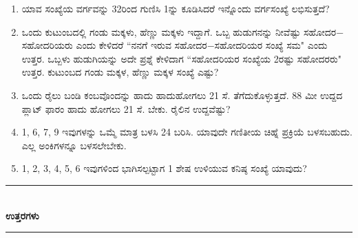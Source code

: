 \begin{enumerate}
\item ಯಾವ ಸಂಖ್ಯೆಯ ವರ್ಗವನ್ನು 32ರಿಂದ ಗುಣಿಸಿ 1ನ್ನು ಕೂಡಿಸಿದರೆ ಇನ್ನೊಂದು ವರ್ಗಸಂಖ್ಯೆ ಲಭಿಸುತ್ತದೆ? 

\item ಒಂದು ಕುಟುಂಬದಲ್ಲಿ ಗಂಡು ಮಕ್ಕಳು, ಹೆಣ್ಣು ಮಕ್ಕಳು ಇದ್ದಾಗೆ. ಒಬ್ಬ ಹುಡುಗನನ್ನು ನೀವೆಷ್ಟು ಸಹೋದರ$-$ಸಹೋದರಿಯರು ಎಂದು ಕೇಳಿದರೆ ``ನನಗೆ ಇರುವ ಸಹೋದರ$-$ಸಹೋದರಿಯರ ಸಂಖ್ಯೆ ಸಮ" ಎಂದು ಉತ್ತರ. ಒಬ್ಬಳು ಹುಡುಗಿಯನ್ನು ಅದೇ ಪ್ರಶ್ನೆ ಕೇಳಿದಾಗ ``ಸಹೋದರಿಯರ ಸಂಖ್ಯೆಯ 2ರಷ್ಟು ಸಹೋದರರು" ಉತ್ತರ. ಕುಟುಂಬದ ಗಂಡು ಮಕ್ಕಳ, ಹೆಣ್ಣು ಮಕ್ಕಳ ಸಂಖ್ಯೆ ಎಷ್ಟು? 

\item ಒಂದು ರೈಲು ಬಂಡಿ ಕಂಬವೊಂದನ್ನು ಹಾದು ಹಾದುಹೋಗಲು 21 ಸೆ. ತೆಗೆದುಕೊಳ್ಳುತ್ತದೆ. 88 ಮೀ ಉದ್ದದ ಪ್ಲಾಟ್ ಫಾರಂ ಹಾದು ಹೋಗಲು 21 ಸೆ. ಬೇಕು. ರೈಲಿನ ಉದ್ದವೆಷ್ಟು? 

\item 1, 6, 7, 9 ಇವುಗಳನ್ನು ಒಮ್ಮೆ ಮಾತ್ರ ಬಳಸಿ 24 ಬರಿಸಿ. ಯಾವುದೇ ಗಣಿತೀಯ ಚಿಹ್ನೆ ಪ್ರಕ್ರಿಯೆ ಬಳಸಬಹುದು. ಎಲ್ಲ ಅಂಕಿಗಳನ್ನೂ ಬಳಸಲೇಬೇಕು. 

\item 1, 2, 3, 4, 5, 6 ಇವುಗಳಿಂದ ಭಾಗಿಸಲ್ಪಟ್ಟಾಗ 1 ಶೇಷ ಉಳಿಯುವ ಕನಿಷ್ಠ ಸಂಖ್ಯೆ ಯಾವುದು? 
\end{enumerate}

\smallskip

\begin{center}
\rule{5cm}{1pt}\\[3pt]
{\Large\bfseries ಉತ್ತರಗಳು}\\[-0.1cm]
\rule{5cm}{1pt}
\end{center}

